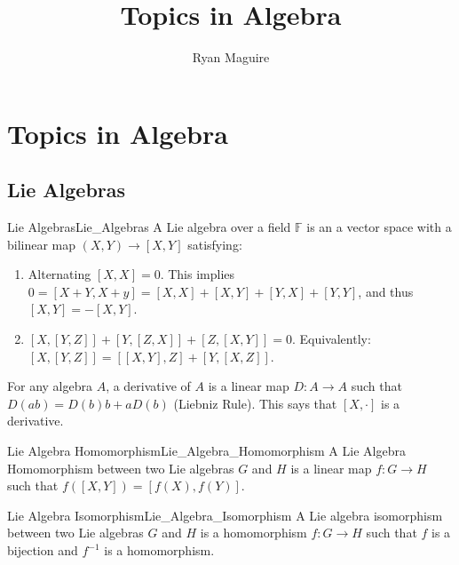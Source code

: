 \documentclass[crop=false,class=book,oneside]{standalone}                      %
\begin{document}
        \title{Topics in Algebra}
        \author{Ryan Maguire}
        \date{\vspace{-5ex}}
        \maketitle
        \tableofcontents
        \clearpage
        \chapter*{Topics in Algebra}
        \vspace{10ex}
        \setcounter{chapter}{1}
    \section{Lie Algebras}
        \begin{ldefinition}{Lie Algebras}{Lie_Algebras}
            A Lie algebra over a field $\mathbb{F}$ is an
            a vector space with a bilinear map $(X,Y)\rightarrow[X,Y]$
            satisfying:
            \begin{enumerate}
                \item Alternating $[X,X]=0$. This implies
                      $0=[X+Y,X+y]=[X,X]+[X,Y]+[Y,X]+[Y,Y]$, and thus
                      $[X,Y]=-[X,Y]$.
                \item $[X,[Y,Z]]+[Y,[Z,X]]+[Z,[X,Y]]=0$. Equivalently:
                      $[X,[Y,Z]]=[[X,Y],Z]+[Y,[X,Z]]$.
            \end{enumerate}
        \end{ldefinition}
        For any algebra $A$, a derivative of $A$ is a linear map
        $D:A\rightarrow{A}$ such that $D(ab)=D(b)b+aD(b)$ (Liebniz Rule).
        This says that $[X,\cdot]$ is a derivative.
        \begin{ldefinition}{Lie Algebra Homomorphism}{Lie_Algebra_Homomorphism}
            A Lie Algebra Homomorphism between two Lie algebras $G$ and $H$
            is a linear map $f:G\rightarrow{H}$ such that
            $f([X,Y])=[f(X),f(Y)]$.
        \end{ldefinition}
        \begin{ldefinition}{Lie Algebra Isomorphism}{Lie_Algebra_Isomorphism}
            A Lie algebra isomorphism between two Lie algebras $G$ and $H$
            is a homomorphism $f:G\rightarrow{H}$ such that $f$ is a bijection
            and $f^{\minus{1}}$ is a homomorphism.
        \end{ldefinition}
\end{document}
